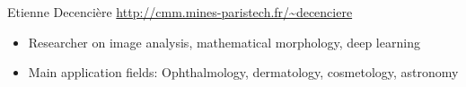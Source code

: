 \documentclass[xcolor=pdftex,dvipsnames,table,mathserif]{beamer}
\begin{document}
{\begin{columns}
\begin{column}{.8\textwidth}
    \begin{block}{Etienne Decencière \hfill \scriptsize{\url{http://cmm.mines-paristech.fr/\~decenciere}}}
      \scriptsize{
    \begin{itemize}
    \item Researcher on image analysis, mathematical morphology, deep learning
    \item Main application fields: Ophthalmology, dermatology, cosmetology, astronomy
    \end{itemize}
    }
  \end{block}

  \end{column}
\end{columns}

}




\end{document}
